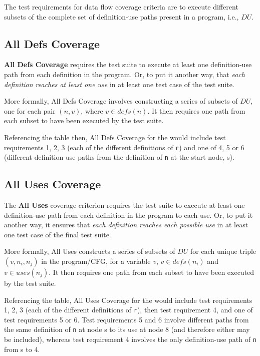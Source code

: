 The test requirements for data flow coverage criteria are to execute different
subsets of the complete set of definition-use paths present in a program, i.e.,
$\mathit{DU}$.

\subsection{All Defs Coverage}

{\bf All Defs Coverage} requires the test suite to execute at least one
definition-use path from each definition in the program. Or, to put it another
way, that {\it each definition reaches at least one use} in at least one test
case of the test suite.

More formally, All Defs Coverage involves constructing a series of subsets of
$\mathit{DU}$, one for each pair $(n, v)$, where $v \in \mathit{defs}(n)$. It
then requires one path from each subset to have been executed by the test suite.

Referencing the table then, All Defs Coverage for the \signmethod would include
test requirements 1, 2, 3 (each of the different definitions of {\tt r}) and one
of 4, 5 or 6 (different definition-use paths from the definition of {\tt n} at
the start node, s).

\subsection{All Uses Coverage}

The {\bf All Uses} coverage criterion requires the test suite to execute at
least one definition-use path from each definition in the program to each use.
Or, to put it another way, it ensures that {\it each definition reaches each
possible use} in at least one test case of the final test suite. 

More formally, All Uses constructs a series of subsets of $DU$ for each unique
triple $(v, n_i, n_j)$ in the program/CFG, %
for a variable $v$, $v \in \mathit{defs}(n_i)$ and $v \in \mathit{uses}(n_j)$. It then
requires one path from each subset to have been executed by the test suite.

Referencing the table, All Uses Coverage for the \signmethod would include
test requirements 1, 2, 3 (each of the different definitions of {\tt r}), then 
test requirement 4, and one of test requirements 5 or 6. Test requirements 5 and
6 involve different paths from the same definition of {\tt n} at node s to its
use at node 8 (and therefore either may be included), whereas test requirement 4
involves the only definition-use path of {\tt n} from s to 4.

